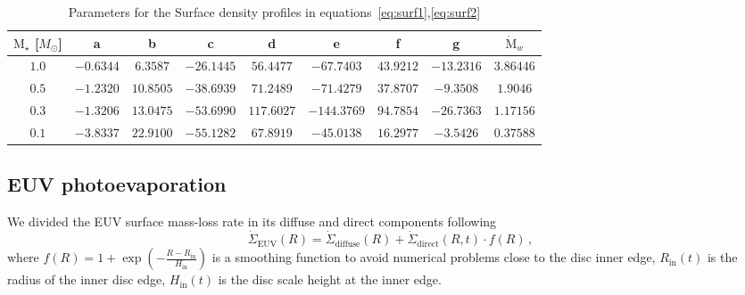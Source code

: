 \documentclass[fleqn,usenatbib,letters]{mnras}
\begin{document}
\begin{table}
\caption{Parameters for the Surface density profiles in equations~\ref{eq:surf1},\ref{eq:surf2}}
\label{tab:fit}
\centering
\begin{tabular}{c c c c c c c c c}
\hline
$\mathrm{M}_\star$ [$M_\odot$] & a & b & c & d & e & f & g & $\dot{\mathrm{M}}_w$ \\
\hline
\hline
   $1.0$ & $-0.6344$ & $6.3587$ & $-26.1445$ & $56.4477$ & $-67.7403$ & $43.9212$ & $-13.2316$ & $3.86446$\\
   $0.5$ & $-1.2320$ & $10.8505$ & $-38.6939$ & $71.2489$ & $-71.4279$ & $37.8707$ & $-9.3508$ & $1.9046$\\
   $0.3$ & $-1.3206$ & $13.0475$ & $-53.6990$ & $117.6027$ & $-144.3769$ & $94.7854$ & $-26.7363$ & $1.17156$\\
   $0.1$ & $-3.8337$ & $22.9100$ & $-55.1282$ & $67.8919$ & $-45.0138$ & $16.2977$ & $-3.5426$ & $0.37588$\\
\hline
\end{tabular}
\end{table}

\subsection{EUV photoevaporation}

We divided the EUV surface mass-loss rate in its diffuse and direct components following \citet{Alexander2007}
\begin{equation}
    \dot{\Sigma}_\mathrm{EUV}(R) = \dot{\Sigma}_\mathrm{diffuse}(R) +  \dot{\Sigma}_\mathrm{direct}(R,t)\cdot f(R) \,,
\end{equation}
where $f(R) = 1+\exp{(-\frac{R-R_\mathrm{in}}{H_\mathrm{in}})}$ is a smoothing function to avoid numerical problems close to the disc inner edge, $R_\mathrm{in}(t)$ is the radius of the inner disc edge, $H_\mathrm{in}(t)$ is the disc scale height at the inner edge.
\end{document}
